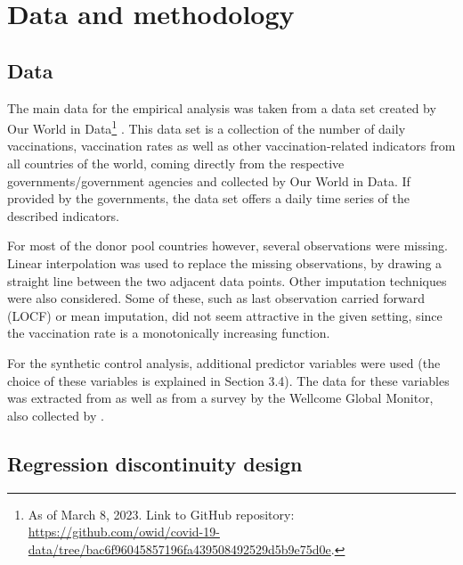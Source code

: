 \documentclass{scrbook}
\begin{document}
\chapter{Data and methodology}

\section{Data}

The main data for the empirical analysis was taken from a data set
created by Our World in
Data\footnote{As of March 8, 2023. Link to GitHub repository: \url{https://github.com/owid/covid-19-data/tree/bac6f96045857196fa439508492529d5b9e75d0e}.}
\parencite{mathieu_global_2021}. This data set is a collection of the
number of daily vaccinations, vaccination rates as well as other
vaccination-related indicators from all countries of the world, coming
directly from the respective governments/government agencies and
collected by Our World in Data. If provided by the governments, the data
set offers a daily time series of the described indicators.

For most of the donor pool countries however, several observations were
missing. Linear interpolation was used to replace the missing
observations, by drawing a straight line between the two adjacent data
points. Other imputation techniques were also considered. Some of these,
such as last observation carried forward (LOCF) or mean imputation, did
not seem attractive in the given setting, since the vaccination rate is
a monotonically increasing function.

For the synthetic control analysis, additional predictor variables were
used (the choice of these variables is explained in Section 3.4). The
data for these variables was extracted from
\textcite{eurostat_eurostat_2023} as well as from a survey by the
Wellcome Global Monitor, also collected by
\textcite{our_world_in_data_share_2020}.

\section{Regression discontinuity design}
\end{document}
